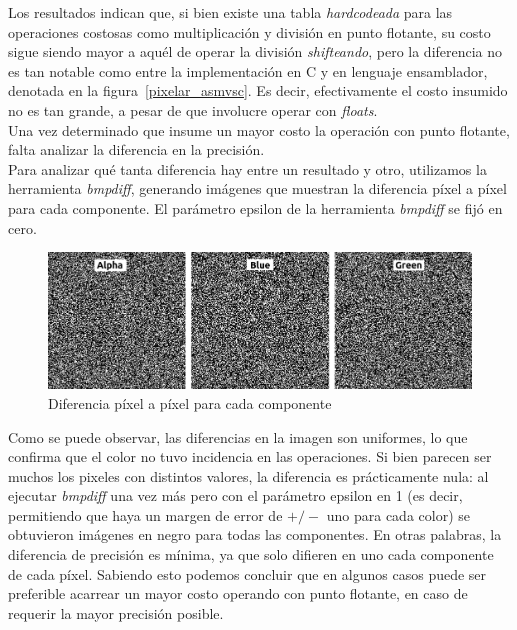 \documentclass[a4paper]{article}
\begin{document}
Los resultados indican que, si bien existe una tabla \textit{hardcodeada} para las operaciones costosas como multiplicación y división en punto flotante, su costo sigue siendo mayor a aquél de operar la división \textit{shifteando}, pero la diferencia no es tan notable como entre la implementación en C y en lenguaje ensamblador, denotada en la figura~\ref{pixelar_asmvsc}. Es decir, efectivamente el costo insumido no es tan grande, a pesar de que involucre operar con \textit{floats}.
\\Una vez determinado que insume un mayor costo la operación con punto flotante, falta analizar la diferencia en la precisión.
\\Para analizar qué tanta diferencia hay entre un resultado y otro, utilizamos la herramienta \textit{bmpdiff}, generando imágenes que muestran la diferencia píxel a píxel para cada componente. El parámetro epsilon de la herramienta \textit{bmpdiff} se fijó en cero.
\\

\begin{figure}[H]
  \begin{center}
	\includegraphics[scale=0.40]{imagenes/pixelardiffExp.jpeg}
	\caption{Diferencia píxel a píxel para cada componente}
	\label{pixelar_diff}
  \end{center}
\end{figure}

Como se puede observar, las diferencias en la imagen son uniformes, lo que confirma que el color no tuvo incidencia en las operaciones. Si bien parecen ser muchos los pixeles con distintos valores, la diferencia es prácticamente nula: al ejecutar \textit{bmpdiff} una vez más pero con el parámetro epsilon en 1 (es decir, permitiendo que haya un margen de error de $+/-$ uno para cada color) se obtuvieron imágenes en negro para todas las componentes. En otras palabras, la diferencia de precisión es mínima, ya que solo difieren en uno cada componente de cada píxel. Sabiendo esto podemos concluir que en algunos casos puede ser preferible acarrear un mayor costo operando con punto flotante, en caso de requerir la mayor precisión posible.
\end{document}
